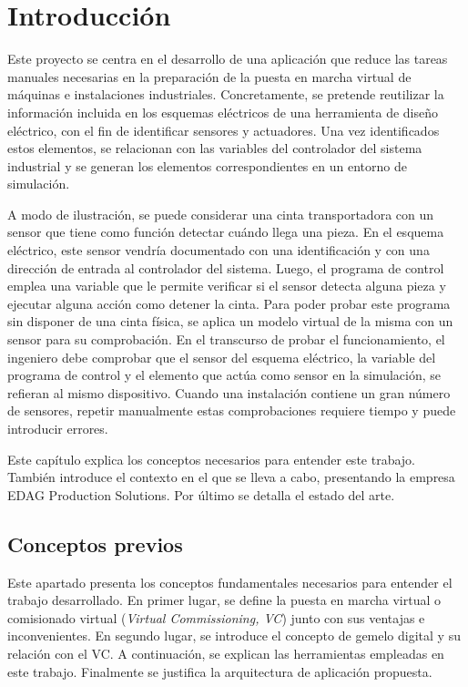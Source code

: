
\chapter{Introducción} \label{ch:Cap_1}


Este proyecto se centra en el desarrollo de una aplicación que reduce las tareas manuales necesarias en la preparación de la puesta en marcha virtual de máquinas e instalaciones industriales. Concretamente, se pretende reutilizar la información incluida en los esquemas eléctricos de una herramienta de diseño eléctrico, con el fin de identificar sensores y actuadores. Una vez identificados estos elementos, se relacionan con las variables del controlador del sistema industrial y se generan los elementos correspondientes en un entorno de simulación.

A modo de ilustración, se puede considerar una cinta transportadora con un sensor que tiene como función detectar cuándo llega una pieza. En el esquema eléctrico, este sensor vendría documentado con una identificación y con una dirección de entrada al controlador del sistema. Luego, el programa de control emplea una variable que le permite verificar si el sensor detecta alguna pieza y ejecutar alguna acción como detener la cinta. Para poder probar este programa sin disponer de una cinta física, se aplica un modelo virtual de la misma con un sensor para su comprobación. En el transcurso de probar el funcionamiento, el ingeniero debe comprobar que el sensor del esquema eléctrico, la variable del programa de control y el elemento que actúa como sensor en la simulación, se refieran al mismo dispositivo. Cuando una instalación contiene un gran número de sensores, repetir manualmente estas comprobaciones requiere tiempo y puede introducir errores.

Este capítulo explica los conceptos necesarios para entender este trabajo. También introduce el contexto en el que se lleva a cabo, presentando la empresa EDAG Production Solutions. Por último se detalla el estado del arte.

\section{Conceptos previos}

Este apartado presenta los conceptos fundamentales necesarios para entender el trabajo desarrollado. En primer lugar, se define la puesta en marcha virtual o comisionado virtual (\textit{Virtual Commissioning, VC}) junto con sus ventajas e inconvenientes. En segundo lugar, se introduce el concepto de gemelo digital y su relación con el VC. A continuación, se explican las herramientas empleadas en este trabajo. Finalmente se justifica la arquitectura de aplicación propuesta.


